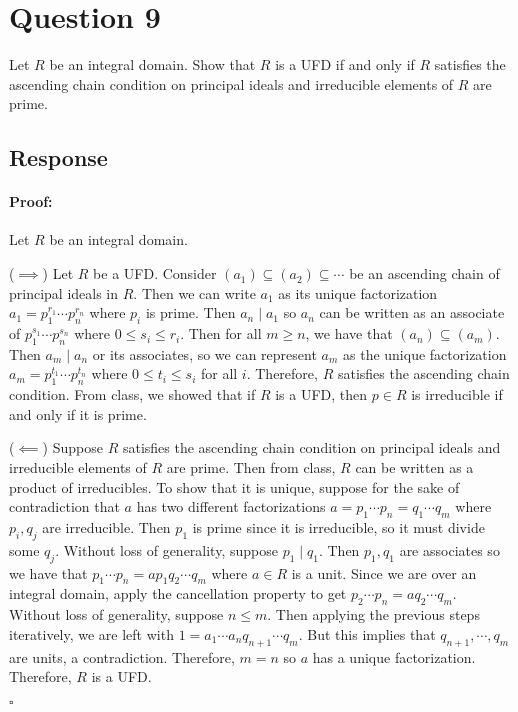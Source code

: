 \documentclass [12pt] {article}
\newenvironment{proof}{\paragraph{Proof:}}{\hfill$\square$}
\begin{document}
\section*{Question 9}
Let $R$ be an integral domain. Show that $R$ is a UFD if and only if $R$ satisfies the ascending
chain condition on principal ideals and irreducible elements of $R$ are prime.
\subsection*{Response}
\begin{proof}
    Let $R$ be an integral domain.
    \vspace{0.5em}

    ($\implies$)
    Let $R$ be a UFD. Consider $(a_1) \subseteq (a_2) \subseteq \cdots$ be an ascending chain of
    principal ideals in $R$. Then we can write $a_1$ as its unique factorization
    $a_1 = p_1^{r_1} \cdots p_n^{r_n}$ where $p_i$ is prime. Then $a_n \mid a_1$ so $a_n$ can be
    written as an associate of $p_1^{s_1} \cdots p_n^{s_n}$ where $0 \leq s_i \leq r_i$. Then for
    all $m \geq n$, we have that $(a_n) \subseteq (a_m)$. Then $a_m \mid a_n$ or its associates, so
    we can represent $a_m$ as the unique factorization $a_m = p_1^{t_1} \cdots p_n^{t_n}$ where
    $0 \leq t_i \leq s_i$ for all $i$. Therefore, $R$ satisfies the ascending chain condition.
    From class, we showed that if $R$ is a UFD, then $p \in R$ is irreducible if and only if it is
    prime.
    \vspace{0.5em}

    ($\impliedby$)
    Suppose $R$ satisfies the ascending chain condition on principal ideals and irreducible elements
    of $R$ are prime. Then from class, $R$ can be written as a product of irreducibles. To show that
    it is unique, suppose for the sake of contradiction that $a$ has two different factorizations
    $a = p_1 \cdots p_n = q_1 \cdots q_m$ where $p_i, q_j$ are irreducible. Then $p_1$ is prime
    since it is irreducible, so it must divide some $q_j$. Without loss of generality, suppose $p_1 \mid q_1$. Then $p_1, q_1$
    are associates so we have that $p_1 \cdots p_n = ap_1 q_2 \cdots q_m$ where $a \in R$ is a unit.
    Since we are over an integral domain, apply the cancellation property to get $p_2 \cdots p_n =
    aq_2 \cdots q_m$. Without loss of generality, suppose $n \leq m$. Then applying the previous
    steps iteratively, we are left with $1 = a_1 \cdots a_n q_{n + 1} \cdots q_m$. But this implies
    that $q_{n + 1}, \cdots, q_m$ are units, a contradiction. Therefore, $m = n$ so $a$ has a unique
    factorization. Therefore, $R$ is a UFD.

\end{proof}
\end{document}
